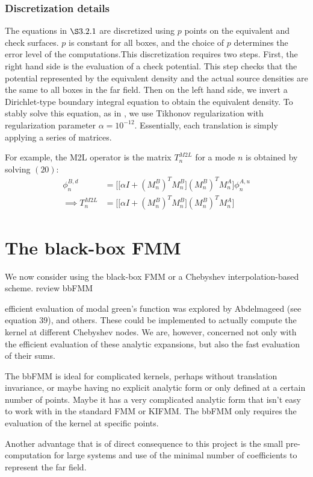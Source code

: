 \documentclass[11pt, oneside]{article}   	%
\begin{document}
\subsubsection{Discretization details}
The equations in $\S3.2.1$ are discretized using $p$ points on the equivalent and check surfaces. $p$ is constant for all boxes, and the choice of $p$ determines the error level of the computations.This discretization requires two steps. First, the right hand side is the evaluation of a check potential. This step checks that the potential represented by the equivalent density and the actual source densities are the same to all boxes in the far field. Then on the left hand side, we invert a Dirichlet-type boundary integral equation to obtain the equivalent density. To stably solve this equation, as in \cite{YBZ}, we use Tikhonov regularization with regularization parameter $\alpha=10^{-12}$. Essentially, each translation is simply applying a series of matrices.

For example, the M2L operator is the matrix $T^{M2L}_n$ for a mode $n$ is obtained by solving $(20)$:
\begin{align}
\phi^{B,d}_n&=\bigg[\big[\alpha I +(M_n^B)^TM_n^B\big](M_n^B)^TM_n^A\bigg]\phi^{A,u}_n\\
\implies T^{M2L}_n &= \bigg[\big[\alpha I +(M_n^B)^TM_n^B\big](M_n^B)^TM_n^A\bigg]
\end{align}


\section{The black-box FMM}
We now consider using the black-box FMM or a Chebyshev interpolation-based scheme. review bbFMM

efficient evaluation of modal green's function was explored by Abdelmageed (see equation $39$), and others. These could be implemented to actually compute the kernel at different Chebyshev nodes. We are, however, concerned not only with the efficient evaluation of these analytic expansions, but also the fast evaluation of their sums.

The bbFMM is ideal for complicated kernels, perhaps without translation invariance, or maybe having no explicit analytic form or only defined at a certain number of points. Maybe it has a very complicated analytic form that isn't easy to work with in the standard FMM or KIFMM. The bbFMM only requires the evaluation of the kernel at specific points.

Another advantage that is of direct consequence to this project is the small pre-computation for large systems and use of the minimal number of coefficients to represent the far field.
\end{document}
